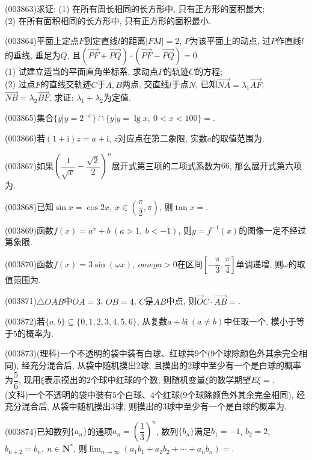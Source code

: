 \item (003863)求证: (1) 在所有周长相同的长方形中, 只有正方形的面积最大;\\
(2) 在所有面积相同的长方形中, 只有正方形的面积最小.
\item (003864)平面上定点$F$到定直线$l$的距离$|FM|=2$, $P$为该平面上的动点, 过$P$作直线$l$的垂线, 垂足为$Q$, 且$(\overrightarrow{PF}+\overrightarrow{PQ})\cdot (\overrightarrow{PF}-\overrightarrow{PQ})=0$.\\
(1) 试建立适当的平面直角坐标系, 求动点$P$的轨迹$C$的方程;\\
(2) 过点$F$的直线交轨迹$C$于$A,B$两点, 交直线$l$于点$N$, 已知$\overrightarrow{NA}=\lambda_1\overrightarrow{AF}$, $\overrightarrow{NB}=\lambda_2\overrightarrow{BF}$, 求证: $\lambda_1+\lambda_2$为定值.
\item (003865)集合$\{y|y=2^{-x}\}\cap\{y|y=\lg x, \ 0<x<100\}=$.
\item (003866)若$(1+\mathrm{i})z=a+\mathrm{i}$, $z$对应点在第二象限, 实数$a$的取值范围为.
\item (003867)如果$\left(\dfrac{1}{\sqrt{x}}-\dfrac{\sqrt{2}}{2}\right)^n$展开式第三项的二项式系数为$66$, 那么展开式第六项为.
\item (003868)已知$\sin x=\cos 2x, \ x\in\left(\dfrac{\pi}{2},\pi\right)$, 则$\tan x=$.
\item (003869)函数$f(x)=a^x+b \ (a>1, \ b<-1)$, 则$y=f^{-1}(x)$的图像一定不经过第象限.
\item (003870)函数$f(x)=3\sin (\omega x), \ omega>0$在区间$\left[-\dfrac{\pi}{3},\dfrac{\pi}{4}\right]$单调递增, 则$\omega$的取值范围为.
\item (003871)$\triangle OAB$中$OA=3$, $OB=4$, $C$是$AB$中点, 则$\overrightarrow OC\cdot \overrightarrow{AB}=$.
\item (003872)若$\{a,b\}\subseteq \{0,1,2,3,4,5,6\}$, 从复数$a+b\mathrm{i} \ (a\ne b)$中任取一个, 模小于等于$5$的概率为.
\item (003873)(理科)一个不透明的袋中装有白球、红球共$9$个($9$个球除颜色外其余完全相同), 经充分混合后, 从袋中随机摸出$2$球, 且摸出的$2$球中至少有一个是白球的概率为$\dfrac 56$, 现用$\xi$表示摸出的$2$个球中红球的个数, 则随机变量$\xi$的数学期望$E\xi=$.\\
(文科)一个不透明的袋中装有$5$个白球、$4$个红球($9$个球除颜色外其余完全相同), 经充分混合后, 从袋中随机摸出$3$球, 则摸出的$3$球中至少有一个是白球的概率为.
\item (003874)已知数列$\{a_n\}$的通项$a_n=\left(\dfrac 13\right)^n$, 数列$\{b_n\}$满足$b_1=-1$, $b_2=2$, $b_{n+2}=b_n, \ n\in \mathbf{N}^*$, 则$\displaystyle\lim_{n\to \infty}(a_1b_1+a_2b_2+\cdots+a_nb_n)=$.
